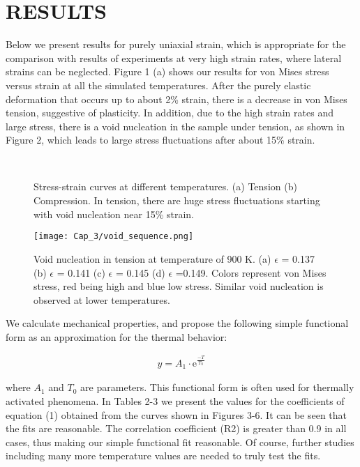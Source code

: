 \section{RESULTS}
Below we present results for purely uniaxial strain, which is appropriate for the comparison with results of experiments at very high strain rates, where lateral strains can be neglected.
Figure 1 (a) shows our results for von Mises stress versus strain at all the simulated temperatures. After the purely elastic deformation that occurs up to about 2\% strain, there is a decrease in von Mises tension, suggestive of plasticity. In addition, due to the high strain rates and large stress, there is a void nucleation in the sample under tension, as shown in Figure 2, which leads to large stress fluctuations after about 15\% strain.

\begin{figure}[htp]
\centering
{}
\\
\caption{Stress-strain curves at different temperatures. (a) Tension (b) Compression. In tension, there are huge stress fluctuations starting with void nucleation near 15\% strain.}
\label{figure:msd_Cu}
\end{figure}

\begin{figure}[htp]
\centering
\texttt{[image: Cap\_3/void\_sequence.png]}
\caption{Void nucleation in tension at temperature of 900 K. (a) $\epsilon$ = 0.137 (b) $\epsilon$ = 0.141 (c) $\epsilon$ = 0.145 (d) $\epsilon$ =0.149. Colors represent von Mises stress, red being high and blue low stress. Similar void nucleation is observed at lower temperatures.}
\label{C3:fg:voidSeq}
\end{figure}

We calculate mechanical properties, and propose the following simple functional form as an approximation for the thermal behavior:

\begin{eqnarray}
y = A_{1}\cdot \mathrm{e}^{\frac{-T}{T_{0}}}
\label{C3:eq:thermalFit}
\end{eqnarray}
	
where $A_{1}$ and $T_{0}$ are parameters. This functional form is often used for thermally activated phenomena. In Tables 2-3 we present the values for the coefficients of equation (1) obtained from the curves shown in Figures 3-6. It can be seen that the fits are reasonable. The correlation coefficient (R2) is greater than 0.9 in all cases, thus making our simple functional fit reasonable. Of course, further studies including many more temperature values are needed to truly test the fits. 

